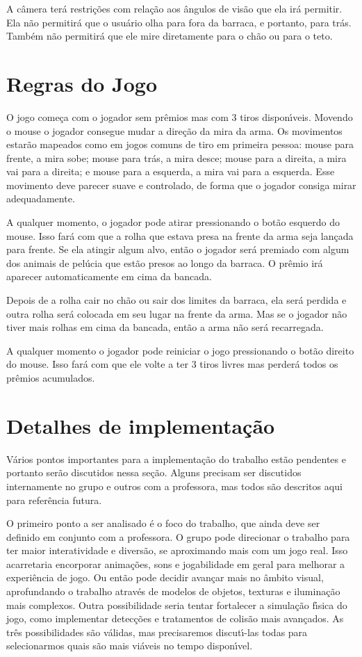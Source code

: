 \documentclass[a4paper,10pt]{article}
\begin{document}
A c\^amera ter\'a restri\c c\~oes com rela\c c\~ao aos \^angulos de vis\~ao que ela ir\'a permitir. Ela n\~ao permitir\'a que o usu\'ario olha para fora da barraca, e portanto, para tr\'as. Tamb\'em n\~ao permitir\'a que ele mire diretamente para o ch\~ao ou para o teto.


\section{Regras do Jogo}
O jogo come\c ca com o jogador sem pr\^emios mas com 3 tiros dispon\'\i{}veis. Movendo o mouse o jogador consegue mudar a dire\c c\~ao da mira da arma. Os movimentos estar\~ao mapeados como em jogos comuns de tiro em primeira pessoa: mouse para frente, a mira sobe; mouse para tr\'as, a mira desce; mouse para a direita, a mira vai para a direita; e mouse para a esquerda, a mira vai para a esquerda. Esse movimento deve parecer suave e controlado, de forma que o jogador consiga mirar adequadamente.

A qualquer momento, o jogador pode atirar pressionando o bot\~ao esquerdo do mouse. Isso far\'a com que a rolha que estava presa na frente da arma seja lan\c cada para frente. Se ela atingir algum alvo, ent\~ao o jogador ser\'a premiado com algum dos animais de pel\'ucia que est\~ao presos ao longo da barraca. O pr\^emio ir\'a aparecer automaticamente em cima da bancada.

Depois de a rolha cair no ch\~ao ou sair dos limites da barraca, ela ser\'a perdida e outra rolha ser\'a colocada em seu lugar na frente da arma. Mas se o jogador n\~ao tiver mais rolhas em cima da bancada, ent\~ao a arma n\~ao ser\'a recarregada.

A qualquer momento o jogador pode reiniciar o jogo pressionando o bot\~ao direito do mouse. Isso far\'a com que ele volte a ter 3 tiros livres mas perder\'a todos os pr\^emios acumulados.


\section{Detalhes de implementa\c c\~ao}

V\'arios pontos importantes para a implementa\c c\~ao do trabalho est\~ao pendentes e portanto ser\~ao discutidos nessa se\c c\~ao. Alguns precisam ser discutidos internamente no grupo e outros com a professora, mas todos s\~ao descritos aqui para refer\^encia futura.

O primeiro ponto a ser analisado \'e o foco do trabalho, que ainda deve ser definido em conjunto com a professora. O grupo pode direcionar o trabalho para ter maior interatividade e divers\~ao, se aproximando mais com um jogo real. Isso acarretaria encorporar anima\c c\~oes, sons e jogabilidade em geral para melhorar a experi\^encia de jogo. Ou ent\~ao pode decidir avan\c car mais no \^ambito visual, aprofundando o trabalho atrav\'es de modelos de objetos, texturas e ilumina\c c\~ao mais complexos. Outra possibilidade seria tentar fortalecer a simula\c c\~ao f\'\i{}sica do jogo, como implementar detec\c c\~oes e tratamentos de colis\~ao mais avan\c cados. As tr\^es possibilidades s\~ao v\'alidas, mas precisaremos discut\'\i{}-las todas para selecionarmos quais s\~ao mais vi\'aveis no tempo dispon\'\i{}vel.
\end{document}
